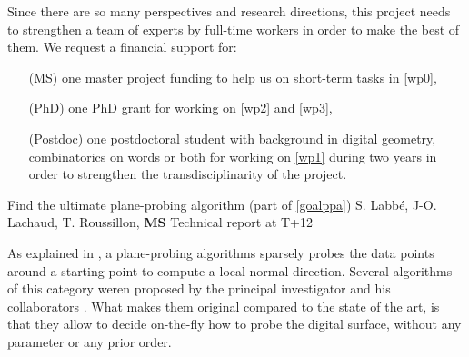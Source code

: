 Since there are so many perspectives and research directions, this project needs
to strengthen a team of experts by full-time workers in order to make the best of them.
We request a financial support for: 
\begin{itemize}
\item[(MS)] one master project funding to help us on short-term tasks in \ref{wp0},
\item[(PhD)] one PhD grant for working on \ref{wp2} and \ref{wp3},
\item[(Postdoc)] one postdoctoral student with background in digital geometry,
  combinatorics on words or both for working on \ref{wp1} during two years
  in order to strengthen the transdisciplinarity of the project. 
\end{itemize}




   {Find the ultimate plane-probing algorithm (part of \ref{goalppa})}
   {S. Labb\'{e}, J-O. Lachaud, T. Roussillon, \textbf{MS}}
   {Technical report at T+12}
\medskip

As explained in , a plane-probing algorithms sparsely probes the data points
around a starting point to compute a local normal direction. Several algorithms of this category
weren proposed by the principal investigator and his collaborators
\cite{LPRTCS2016, LPRDGCI2016, LPRJMIV2017}.
What makes them original compared to the state of the art, is that they allow to decide on-the-fly
how to probe the digital surface, without any parameter or any prior order.


